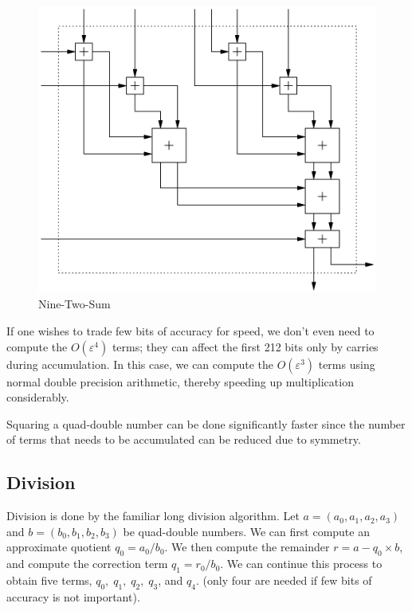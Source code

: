 \documentclass[11pt]{article}
\theoremstyle{definition}
\newcommand{\eps}{\varepsilon}
\begin{document}
\begin{figure}
  \begin{center} 
    \includegraphics{nine-two-sum.eps}
    \caption{\label{nine_two_sum_fig}{\sc Nine-Two-Sum}}
  \end{center}
\end{figure}

If one wishes to trade few bits of accuracy for speed, we don't
even need to compute the $O(\eps^4)$ terms; they can affect the
first 212 bits only by carries during accumulation.  
In this case, we can compute the
$O(\eps^3)$ terms using normal double precision arithmetic, 
thereby speeding up multiplication considerably.

Squaring a quad-double number can be done significantly
faster since the number of terms that needs to be accumulated
can be reduced due to symmetry.

\subsection{Division}
Division is done by the familiar long division algorithm.
Let $a = (a_0, a_1, a_2, a_3)$ and $b = (b_0, b_1, b_2, b_3)$ be 
quad-double numbers.  We can first compute
an approximate quotient $q_0 = a_0 / b_0$.  We then compute
the remainder $r = a - q_0 \times b$, and compute the 
correction term $q_1 = r_0 / b_0$.  We can continue this process 
to obtain five terms, $q_0,\; q_1,\; q_2,\; q_3$, and $q_4$.
(only four are needed if few bits of accuracy is not important).
\end{document}
